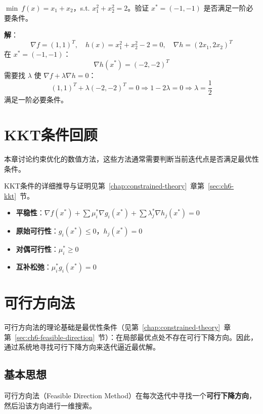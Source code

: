 \begin{example}[验证最优性条件]
$\min\ f(x) = x_1 + x_2$，s.t. $x_1^2 + x_2^2 = 2$。验证 $x^* = (-1, -1)$ 是否满足一阶必要条件。

\textbf{解}：
\[
\nabla f = (1, 1)^T,\quad h(x) = x_1^2 + x_2^2 - 2 = 0,\quad \nabla h = (2x_1, 2x_2)^T
\]
在 $x^* = (-1, -1)$：
\[
\nabla h(x^*) = (-2, -2)^T
\]
需要找 $\lambda$ 使 $\nabla f + \lambda \nabla h = 0$：
\[
(1, 1)^T + \lambda(-2, -2)^T = 0 \Rightarrow 1 - 2\lambda = 0 \Rightarrow \lambda = \frac{1}{2}
\]
满足一阶必要条件。
\end{example}

\section{KKT条件回顾}\label{sec:ch7-kkt-review}

本章讨论约束优化的数值方法，这些方法通常需要判断当前迭代点是否满足最优性条件。
\begin{conceptbox}[KKT条件速查]
KKT条件的详细推导与证明见第~\ref{chap:constrained-theory}~章第~\ref{sec:ch6-kkt}~节。
\begin{itemize}
    \item \textbf{平稳性}：$\nabla f(x^*) + \sum \mu_i^* \nabla g_i(x^*) + \sum \lambda_j^* \nabla h_j(x^*) = 0$
    \item \textbf{原始可行性}：$g_i(x^*) \leq 0$，$h_j(x^*) = 0$
    \item \textbf{对偶可行性}：$\mu_i^* \geq 0$
    \item \textbf{互补松弛}：$\mu_i^* g_i(x^*) = 0$
\end{itemize}
\end{conceptbox}
\section{可行方向法}\label{sec:ch7-feasible-direction}

可行方向法的理论基础是最优性条件（见第~\ref{chap:constrained-theory}~章第~\ref{sec:ch6-feasible-direction}~节）：在局部最优点处不存在可行下降方向。因此，通过系统地寻找可行下降方向来迭代逼近最优解。

\subsection{基本思想}

可行方向法（Feasible Direction Method）在每次迭代中寻找一个\textbf{可行下降方向}，然后沿该方向进行一维搜索。

